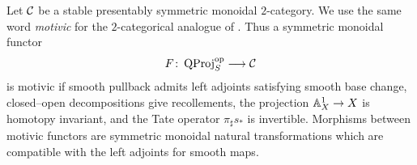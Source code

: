\documentclass[11pt]{book}
\begin{document}
	Let $\mathcal{C}$ be a stable presentably symmetric monoidal $2$-category. We use the same word \emph{motivic} for the $2$-categorical analogue of . Thus a symmetric monoidal functor
	\[
		F\colon\operatorname{QProj}_S^{\textup{op}}\longrightarrow\mathcal{C}
	\]
	is motivic if smooth pullback admits left adjoints satisfying smooth base change, closed--open decompositions give recollements, the projection $\mathbb{A}^1_X\to X$ is homotopy invariant, and the Tate operator $\pi_\sharp s_*$ is invertible. Morphisms between motivic functors are symmetric monoidal natural transformations which are compatible with the left adjoints for smooth maps.

\end{document}
